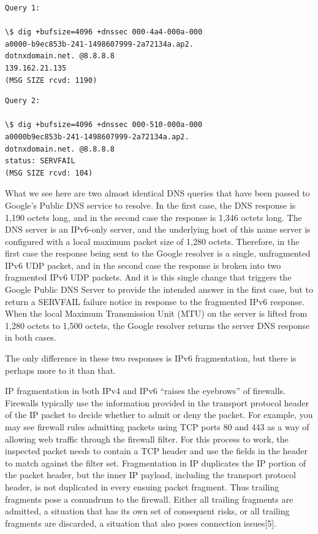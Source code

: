 \begin{verbatim}
Query 1:

\$ dig +bufsize=4096 +dnssec 000-4a4-000a-000
a0000-b9ec853b-241-1498607999-2a72134a.ap2.
dotnxdomain.net. @8.8.8.8
139.162.21.135
(MSG SIZE rcvd: 1190)
\end{verbatim}

\begin{verbatim}
Query 2:

\$ dig +bufsize=4096 +dnssec 000-510-000a-000
a0000b9ec853b-241-1498607999-2a72134a.ap2.
dotnxdomain.net. @8.8.8.8
status: SERVFAIL
(MSG SIZE rcvd: 104)
\end{verbatim}

What we see here are two almost identical DNS queries that have
been passed to Google’s Public DNS service to resolve.
In the first case, the DNS response is 1,190 octets long, and in the
second case the response is 1,346 octets long. The DNS server is an
IPv6-only server, and the underlying host of this name server is configured
with a local maximum packet size of 1,280 octets. Therefore,
in the first case the response being sent to the Google resolver is a
single, unfragmented IPv6 UDP packet, and in the second case the
response is broken into two fragmented IPv6 UDP packets. And it is
this single change that triggers the Google Public DNS Server to provide
the intended answer in the first case, but to return a SERVFAIL
failure notice in response to the fragmented IPv6 response. When the
local Maximum Transmission Unit (MTU) on the server is lifted from
1,280 octets to 1,500 octets, the Google resolver returns the server
DNS response in both cases. 

The only difference in these two responses is IPv6 fragmentation, but
there is perhaps more to it than that.

IP fragmentation in both IPv4 and IPv6 “raises the eyebrows” of
firewalls. Firewalls typically use the information provided in the
transport protocol header of the IP packet to decide whether to admit
or deny the packet. For example, you may see firewall rules admitting
packets using TCP ports 80 and 443 as a way of allowing web traffic
through the firewall filter. For this process to work, the inspected
packet needs to contain a TCP header and use the fields in the header
to match against the filter set. Fragmentation in IP duplicates the IP
portion of the packet header, but the inner IP payload, including the
transport protocol header, is not duplicated in every ensuing packet
fragment. Thus trailing fragments pose a conundrum to the firewall.
Either all trailing fragments are admitted, a situation that has its own
set of consequent risks, or all trailing fragments are discarded, a situation
that also poses connection issues[5].

